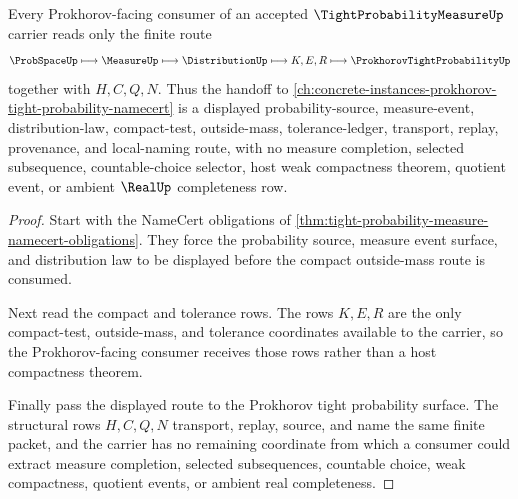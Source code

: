 \begin{theorem}
\label{thm:tight-probability-measure-prokhorov-handoff}
Every Prokhorov-facing consumer of an accepted $\TightProbabilityMeasureUp$ carrier reads only the finite route
$$
\ProbSpaceUp \longmapsto \MeasureUp \longmapsto \DistributionUp \longmapsto K,E,R \longmapsto \ProkhorovTightProbabilityUp
$$
together with $H,C,Q,N$. Thus the handoff to \autoref{ch:concrete-instances-prokhorov-tight-probability-namecert} is a displayed probability-source, measure-event, distribution-law, compact-test, outside-mass, tolerance-ledger, transport, replay, provenance, and local-naming route, with no measure completion, selected subsequence, countable-choice selector, host weak compactness theorem, quotient event, or ambient $\RealUp$ completeness row.
\end{theorem}
\begin{proof}
Start with the NameCert obligations of \autoref{thm:tight-probability-measure-namecert-obligations}. They force the probability source, measure event surface, and distribution law to be displayed before the compact outside-mass route is consumed.

Next read the compact and tolerance rows. The rows $K,E,R$ are the only compact-test, outside-mass, and tolerance coordinates available to the carrier, so the Prokhorov-facing consumer receives those rows rather than a host compactness theorem.

Finally pass the displayed route to the Prokhorov tight probability surface. The structural rows $H,C,Q,N$ transport, replay, source, and name the same finite packet, and the carrier has no remaining coordinate from which a consumer could extract measure completion, selected subsequences, countable choice, weak compactness, quotient events, or ambient real completeness.
\end{proof}



